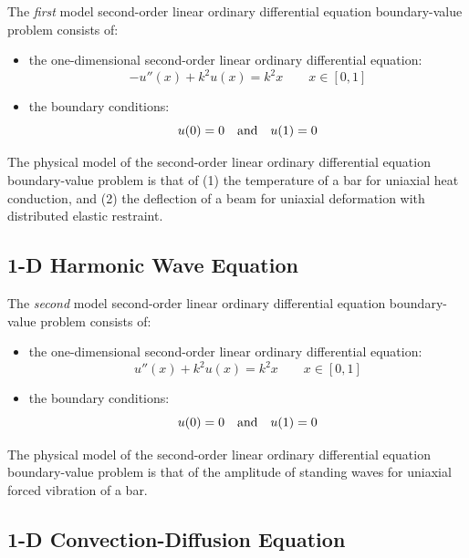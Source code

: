 \documentclass[10pt]{article}		%
\numberwithin{equation}{section}
\begin{document}
The \textit{first} model second-order linear ordinary differential equation boundary-value problem consists of:
\begin{itemize}
	\item the one-dimensional second-order linear ordinary differential equation:
	\begin{equation}
	-u''(x)+k^2u(x)=k^2x \qquad x \in [0, 1]
	\end{equation}
	\item the boundary conditions:
	\begin{equation}
	u(0) = 0 \quad \textnormal{and} \quad u(1) = 0 
	\end{equation}
\end{itemize}
The physical model of the second-order linear ordinary differential equation boundary-value problem is that of (1) the temperature of a bar for uniaxial heat conduction, and (2) the deflection of a beam for uniaxial deformation with distributed elastic restraint.


\subsection{1-D Harmonic Wave Equation}

The \textit{second} model second-order linear ordinary differential equation boundary-value problem consists of:
\begin{itemize}
	\item the one-dimensional second-order linear ordinary differential equation:
	\begin{equation}
	u''(x)+k^2u(x)=k^2x \qquad x \in [0, 1]
	\end{equation}
	\item the boundary conditions:
	\begin{equation}
	u(0) = 0 \quad \textnormal{and} \quad u(1) = 0 
	\end{equation}
\end{itemize}
The physical model of the second-order linear ordinary differential equation boundary-value problem is that of the amplitude of standing waves for uniaxial forced vibration of a bar.

\subsection{1-D Convection-Diffusion Equation}
\end{document}
